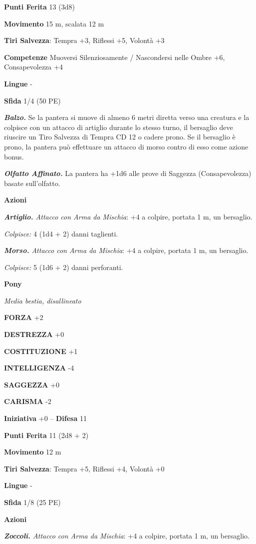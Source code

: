 \begin{multicols}{2}
\textbf{Punti Ferita} 13 (3d8)

\textbf{Movimento} 15 m, scalata 12 m

\textbf{Tiri Salvezza}: Tempra +3, Riflessi +5, Volontà +3 

\textbf{Competenze} Muoversi Silenziosamente / Nascondersi nelle Ombre +6, Consapevolezza +4

\textbf{Lingue} -

\textbf{Sfida} 1/4 (50 PE)

\emph{\textbf{Balzo.}} Se la pantera si muove di almeno 6 metri diretta verso una creatura e la colpisce con un attacco di artiglio durante lo stesso turno, il bersaglio deve riuscire un Tiro Salvezza di Tempra CD 12 o cadere prono. Se il bersaglio è prono, la pantera può effettuare un  attacco di morso contro di esso come azione bonus.

\emph{\textbf{Olfatto Affinato.}} La pantera ha +1d6 alle prove di Saggezza (Consapevolezza) basate sull'olfatto.

\textbf{Azioni}

\emph{\textbf{Artiglio.} Attacco con Arma da Mischia}: +4 a colpire, portata 1 m, un bersaglio.

\emph{Colpisce:} 4 (1d4 + 2) danni taglienti.

\emph{\textbf{Morso.} Attacco con Arma da Mischia}: +4 a colpire, portata 1 m, un bersaglio.

\emph{Colpisce:} 5 (1d6 + 2) danni perforanti.


\medskip\textbf{Pony}

\emph{Media bestia, disallineato}

\textbf{FORZA} +2

\textbf{DESTREZZA} +0

\textbf{COSTITUZIONE} +1

\textbf{INTELLIGENZA} -4

\textbf{SAGGEZZA} +0

\textbf{CARISMA} -2

\textbf{Iniziativa} +0 -- \textbf{Difesa} 11

\textbf{Punti Ferita} 11 (2d8 + 2)

\textbf{Movimento} 12 m

\textbf{Tiri Salvezza}: Tempra +5, Riflessi +4, Volontà +0

\textbf{Lingue} -

\textbf{Sfida} 1/8 (25 PE)

\textbf{Azioni}

\emph{\textbf{Zoccoli.} Attacco con Arma da Mischia}: +4 a colpire, portata 1 m, un bersaglio.


\end{multicols}
